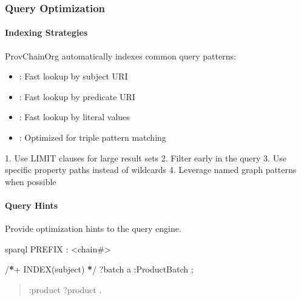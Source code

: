 \documentclass[letterpaper,10pt,english]{sphinxmanual}
\begin{document}
\subsubsection{Query Optimization}
\label{\detokenize{api/sparql-api:query-optimization}}

\paragraph{Indexing Strategies}
\label{\detokenize{api/sparql-api:indexing-strategies}}
\sphinxAtStartPar
ProvChainOrg automatically indexes common query patterns:
\begin{itemize}
\item {} 
\sphinxAtStartPar
{}: Fast lookup by subject URI

\item {} 
\sphinxAtStartPar
{}: Fast lookup by predicate URI

\item {} 
\sphinxAtStartPar
{}: Fast lookup by literal values

\item {} 
\sphinxAtStartPar
{}: Optimized for triple pattern matching

\end{itemize}

\sphinxAtStartPar
{}
1. Use LIMIT clauses for large result sets
2. Filter early in the query
3. Use specific property paths instead of wildcards
4. Leverage named graph patterns when possible


\paragraph{Query Hints}
\label{\detokenize{api/sparql-api:query-hints}}
\sphinxAtStartPar
Provide optimization hints to the query engine.

\sphinxAtStartPar
{}
{\color{red}\bfseries{}\textasciigrave{}\textasciigrave{}}{\color{red}\bfseries{}\textasciigrave{}}sparql
PREFIX : \textless{}\sphinxhyphen{}chain\#\textgreater{}
\begin{description}
\sphinxAtStartPar
/{\color{red}\bfseries{}*}+ INDEX(subject) {\color{red}\bfseries{}*}/
?batch a :ProductBatch ;
\begin{quote}

\sphinxAtStartPar
:product ?product .
\end{quote}

\end{description}
\end{document}
